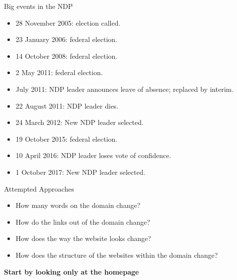 \documentclass[10pt]{beamer}
\begin{document}
\begin{frame}{Big events in the NDP}

\begin{itemize}
\item 28 November 2005: election called.
\item 23 January 2006: federal election.
\item 14 October 2008: federal election.
\item 2 May 2011: federal election.
\item July 2011: NDP leader announces leave of absence; replaced by interim.
\item 22 August 2011: NDP leader dies.
\item 24 March 2012: New NDP leader selected.
\item 19 October 2015: federal election.
\item 10 April 2016: NDP leader loses vote of confidence.
\item 1 October 2017: New NDP leader selected.
\end{itemize}

\end{frame}

\begin{frame}{Attempted Approaches}
\Large
\begin{itemize}
\itemsep1.0em
\item How many words on the domain change?
\item How do the links out of the domain change?
\item How does the way the website looks change?
\item How does the structure of the websites within the domain change?
\end{itemize}

\pause
\centering
\textbf{Start by looking only at the homepage}
\end{frame}
\end{document}
